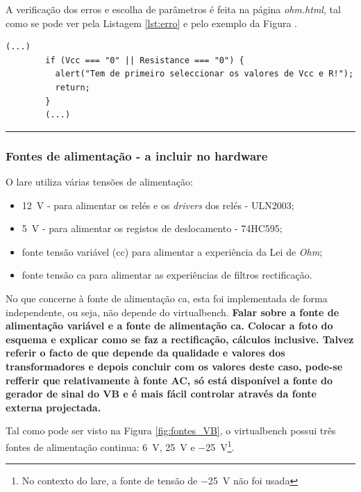 A verificação dos erros e escolha de parâmetros é feita na página \textit{ohm.html}, tal como se pode ver pela Listagem \ref{lst:erro} e pelo exemplo da Figura .

\begin{center}
	\begin{minipage}{0.7\linewidth}
		\begin{lstlisting}[language=html, caption=Erro na página \textit{ohm.html}, label=lst:erro]
		(...)
        if (Vcc === "0" || Resistance === "0") {
          alert("Tem de primeiro seleccionar os valores de Vcc e R!");
          return;
        }
		(...)
	\end{lstlisting}
	\end{minipage}
\end{center}

\hrule

\subsubsection{Fontes de alimentação - a incluir no hardware}
O \acrshort{lare} utiliza várias tensões de alimentação:
\begin{itemize}
	\item \SI{12}{\volt} - para alimentar os relés e os \textit{drivers} dos relés - ULN2003;
	\item \SI{5}{\volt} - para alimentar os registos de deslocamento - 74HC595;
	\item fonte tensão variável (\acrshort{cc}) para alimentar a experiência da Lei de \textit{Ohm};
	\item fonte tensão \acrshort{ca} para alimentar as experiências de filtros rectificação.
\end{itemize}

No que concerne à fonte de alimentação \acrshort{ca}, esta foi implementada de forma independente, ou seja, não depende do \acrshort{virtualbench}. \textbf{Falar sobre a fonte de alimentação variável e a fonte de alimentação \acrshort{ca}. Colocar a foto do esquema e explicar como se faz a rectificação, cálculos inclusive. Talvez referir o facto de que depende da qualidade e valores dos transformadores e depois concluir com os valores deste caso, pode-se refferir que relativamente à fonte AC, só está disponível a fonte do gerador de sinal do VB e é mais fácil controlar através da fonte externa projectada.}

Tal como pode ser visto na Figura \ref{fig:fontes_VB}, o \acrshort{virtualbench} possui três fontes de alimentação continua: \SI{6}{\volt}, \SI{25}{\volt} e \SI{-25}{\volt}\footnote{No contexto do \acrshort{lare}, a fonte de tensão de \SI{-25}{\volt} não foi usada}. 

